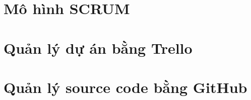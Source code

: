 \section{Mô hình SCRUM}
\section{Quản lý dự án bằng Trello}
\section{Quản lý source code bằng GitHub}